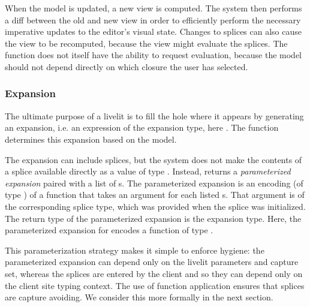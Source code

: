 When the model is updated, a new view is 
computed. The system then performs a diff between the old and new view in order to 
efficiently perform the necessary imperative updates to the editor's visual state.
Changes to splices can also cause the view to be recomputed, because the view might 
evaluate the splices. The  function does not itself 
have the ability to request evaluation, because the model should not depend directly  
on which closure the user has selected. 

\subsubsection{Expansion}
\label{sec:expansion}
The ultimate purpose of a livelit is to fill the hole where it appears by generating an expansion,
i.e. an expression of the expansion type, here .
The  function determines this expansion based on the model.

The expansion can include splices, but the system does not make the contents of a splice 
available directly as a value of type . Instead,  returns a \emph{parameterized expansion}
paired with a list of s. 
The {parameterized expansion}
 is an encoding (of type ) of a function 
 that takes an argument for each listed s. 
 That argument is of the corresponding splice 
type, which was provided when the splice was initialized. 
 The return type of the parameterized expansion is the expansion type.
 Here, the parameterized expansion for  encodes a function of type 
 .

This parameterization strategy makes it simple to enforce hygiene: the parameterized expansion 
can depend only on the livelit parameters and capture set, whereas the splices are entered by the client and so they can 
depend only on the client site typing context. The use of function application ensures
that splices are capture avoiding. We consider this more formally in the next section.
